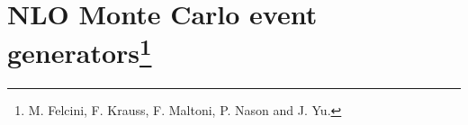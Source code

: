 
\section{NLO Monte Carlo event generators\protect\footnote{M. Felcini, F. Krauss, 
F. Maltoni, P. Nason and J. Yu.}}
\newcommand\pperpmin{p_\perp^{\rm min}}

\def\fortran{Fortran\xspace}
\providecommand{\pythia}{{\sc Pythia}}
\def\phojet{Phojet\xspace}
\providecommand{\pythiasix}{{\sc Pythia~6}}
\providecommand{\pythiaeight}{{\sc Pythia~8}}
\providecommand{\herwig}{{\sc Herwig}}
\providecommand{\herwigsix}{{\sc Herwig~6}}
\providecommand{\herwigpp}{{\sc Herwig}\raisebox{0.1ex}{\small $++$}}
\providecommand{\sherpa}{{\sc Sherpa}}
\providecommand{\alpgen}{{\sc AlpGen}}
\def\helac{HELAC\xspace}
\def\charybdis{Charybdis\xspace}
\def\jimmy{Jimmy\xspace}
\def\rivet{Rivet\xspace}
\def\rivetgun{Rivetgun\xspace}
\def\professor{Professor\xspace}
\def\fastjet{FastJet\xspace}
\def\hepmc{HepMC\xspace}
\def\agile{AGILe\xspace}
\def\hztool{HZTool\xspace}
\def\numpy{NumPy\xspace}
\def\scipy{SciPy\xspace}
\def\minuit{Minuit\xspace}
\def\pyminuit{PyMinuit\xspace}
\def\python{Python\xspace}
\def\kT{\ensuremath{k_{\mathrm{T}}}} %
\newcommand\POWHEG{{\sc P\scalebox{0.9}{OWHEG}}\xspace}
\newcommand\POWHEGBOX{{\sc P\scalebox{0.9}{OWHEG} B\scalebox{0.9}{OX}}\xspace}
\newcommand\MCatNLO{{\sc M\scalebox{0.9}{C}@N\scalebox{0.9}{LO}}\xspace}
\newcommand\ARIADNE{{\sc A\scalebox{0.9}{RIADNE}}\xspace}
\newcommand\ADICIC{{\sc A\scalebox{0.9}{DICIC}++}\xspace}
\newcommand\AMEGIC{{\sc A\scalebox{0.9}{MEGIC}++}\xspace}
\newcommand\Comix{{\sc Comix}\xspace}
\newcommand\HNNLO{{\sc H\scalebox{0.9}{NNLO}}\xspace}
\newcommand\MGME{{\sc M\scalebox{0.9}{AD}G\scalebox{0.9}{RAPH/}M\scalebox{0.9}{AD}E\scalebox{0.9}{VENT}}\xspace}





